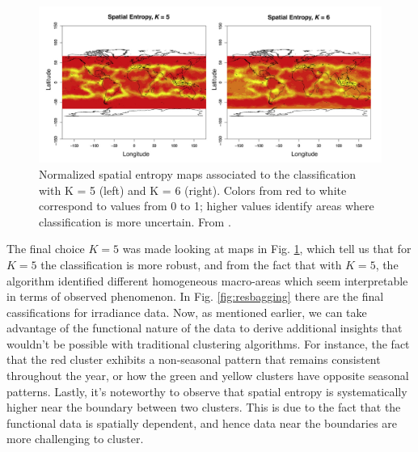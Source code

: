 \begin{figure}[H]
    \centering
    \includegraphics[scale=0.5]{Images/irrentropy.png}
    \caption[Spatial entropy for irradiance data.]{Normalized spatial entropy maps associated to the classification with K = 5 (left) and K = 6 (right). Colors from red to white correspond to values from 0 to 1; higher values identify areas where classification is more uncertain. From \citeauthor{secchi_bagging_2013} \citeyear{secchi_bagging_2013}.}
    \label{fig:irrentropy}
\end{figure}

The final choice $K=5$ was made looking at maps in Fig. \ref{fig:irrentropy}, which tell us that for $K=5$ the classification is more robust, and from the fact that with $K=5$, the algorithm identified different homogeneous macro-areas which seem interpretable in terms of observed phenomenon. In Fig. \ref{fig:resbagging} there are the final cassifications for irradiance data. Now, as mentioned earlier, we can take advantage of the functional nature of the data to derive additional insights that wouldn't be possible with traditional clustering algorithms. For instance, the fact that the red cluster exhibits a non-seasonal pattern that remains consistent throughout the year, or how the green and yellow clusters have opposite seasonal patterns. Lastly, it's noteworthy to observe that spatial entropy is systematically higher near the boundary between two clusters. This is due to the fact that the functional data is spatially dependent, and hence data near the boundaries are more challenging to cluster.

